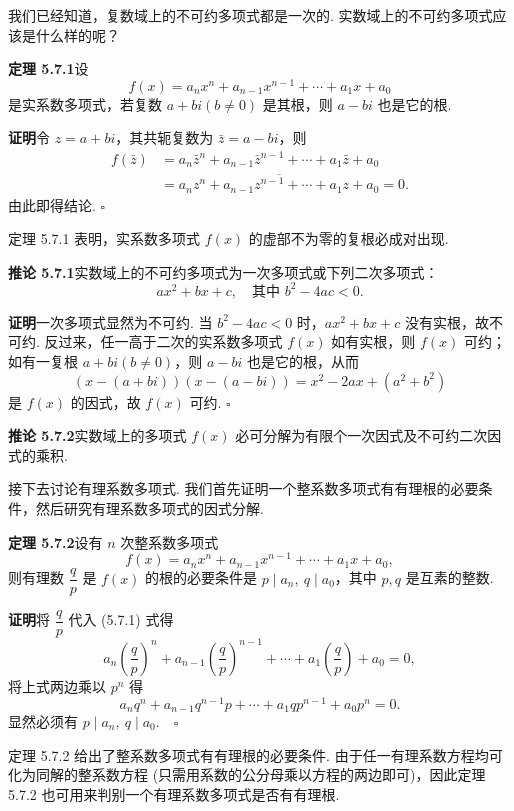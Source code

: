\documentclass[UTF8,12pt,a4paper,fontset=fandol]{ctexart}
\begin{document}
我们已经知道，复数域上的不可约多项式都是一次的. 实数域上的不可约多项式应该是什么样的呢？

\noindent\textbf{定理 5.7.1}\quad 设
\[
f(x)=a_nx^n+a_{n-1}x^{n-1}+\cdots+a_1x+a_0
\]
是实系数多项式，若复数 $a+bi(b\neq 0)$ 是其根，则 $a-bi$ 也是它的根.

\noindent\textbf{证明}\quad 令 $z=a+bi$，其共轭复数为 $\bar z=a-bi$，则
\[
\begin{aligned}
f(\bar z)&=a_n\bar z^n+a_{n-1}\bar z^{n-1}+\cdots+a_1\bar z+a_0\\
&=\overline{a_nz^n+a_{n-1}z^{n-1}+\cdots+a_1z+a_0}=0.
\end{aligned}
\]
由此即得结论. $\square$

定理 5.7.1 表明，实系数多项式 $f(x)$ 的虚部不为零的复根必成对出现.

\noindent\textbf{推论 5.7.1}\quad 实数域上的不可约多项式为一次多项式或下列二次多项式：
\[
ax^2+bx+c,\quad \text{其中 } b^2-4ac<0.
\]

\noindent\textbf{证明}\quad 一次多项式显然为不可约. 当 $b^2-4ac<0$ 时，$ax^2+bx+c$ 没有实根，故不可约. 反过来，任一高于二次的实系数多项式 $f(x)$ 如有实根，则 $f(x)$ 可约；如有一复根 $a+bi(b\neq 0)$，则 $a-bi$ 也是它的根，从而
\[
(x-(a+bi))(x-(a-bi))=x^2-2ax+(a^2+b^2)
\]
是 $f(x)$ 的因式，故 $f(x)$ 可约. $\square$

\noindent\textbf{推论 5.7.2}\quad 实数域上的多项式 $f(x)$ 必可分解为有限个一次因式及不可约二次因式的乘积.

接下去讨论有理系数多项式. 我们首先证明一个整系数多项式有有理根的必要条件，然后研究有理系数多项式的因式分解.

\noindent\textbf{定理 5.7.2}\quad 设有 $n$ 次整系数多项式
\begin{equation}
f(x)=a_nx^n+a_{n-1}x^{n-1}+\cdots+a_1x+a_0,
\tag{5.7.1}
\end{equation}
则有理数 $\dfrac q p$ 是 $f(x)$ 的根的必要条件是 $p\mid a_n,\ q\mid a_0$，其中 $p,q$ 是互素的整数.

\noindent\textbf{证明}\quad 将 $\dfrac q p$ 代入 (5.7.1) 式得
\[
a_n\left(\frac q p\right)^n+a_{n-1}\left(\frac q p\right)^{n-1}+\cdots+a_1\left(\frac q p\right)+a_0=0,
\]
将上式两边乘以 $p^n$ 得
\[
a_nq^n+a_{n-1}q^{n-1}p+\cdots+a_1qp^{n-1}+a_0p^n=0.
\]
显然必须有 $p\mid a_n,\ q\mid a_0.\quad \square$

定理 5.7.2 给出了整系数多项式有有理根的必要条件. 由于任一有理系数方程均可化为同解的整系数方程 (只需用系数的公分母乘以方程的两边即可)，因此定理 5.7.2 也可用来判别一个有理系数多项式是否有有理根.
\end{document}
